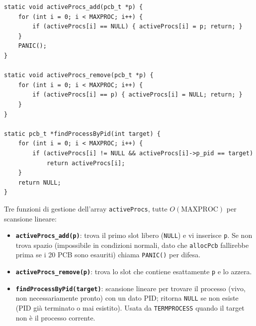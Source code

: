 \documentclass[11pt,a4paper]{article}
\newcommand{\code}[1]{\texttt{#1}}
\newcommand{\func}[1]{\textbf{\texttt{#1}}}
\begin{document}
\begin{lstlisting}
static void activeProcs_add(pcb_t *p) {
    for (int i = 0; i < MAXPROC; i++) {
        if (activeProcs[i] == NULL) { activeProcs[i] = p; return; }
    }
    PANIC();
}

static void activeProcs_remove(pcb_t *p) {
    for (int i = 0; i < MAXPROC; i++) {
        if (activeProcs[i] == p) { activeProcs[i] = NULL; return; }
    }
}

static pcb_t *findProcessByPid(int target) {
    for (int i = 0; i < MAXPROC; i++) {
        if (activeProcs[i] != NULL && activeProcs[i]->p_pid == target)
            return activeProcs[i];
    }
    return NULL;
}
\end{lstlisting}
Tre funzioni di gestione dell'array \code{activeProcs}, tutte $O(\text{MAXPROC})$
per scansione lineare:
\begin{itemize}
\item \func{activeProcs\_add(p)}: trova il primo slot libero
  (\code{NULL}) e vi inserisce \code{p}. Se non trova spazio (impossibile in
  condizioni normali, dato che \code{allocPcb} fallirebbe prima se i 20 PCB
  sono esauriti) chiama \code{PANIC()} per difesa.
\item \func{activeProcs\_remove(p)}: trova lo slot che contiene esattamente
  \code{p} e lo azzera.
\item \func{findProcessByPid(target)}: scansione lineare per trovare il
  processo (vivo, non necessariamente pronto) con un dato PID; ritorna
  \code{NULL} se non esiste (PID già terminato o mai esistito). Usata da
  \code{TERMPROCESS} quando il target non è il processo corrente.
\end{itemize}
\end{document}
